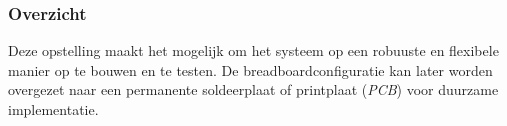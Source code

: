 
\subsubsection{Overzicht}
Deze opstelling maakt het mogelijk om het systeem op een robuuste en flexibele manier op te bouwen en te testen. De breadboardconfiguratie kan later worden overgezet naar een permanente soldeerplaat of printplaat (\textit{PCB}) voor duurzame implementatie.


















